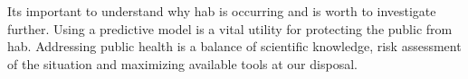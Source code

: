 Its important to understand why \gls{hab} is occurring and is worth to investigate further. Using a predictive model is a vital utility for protecting the public from \gls{hab}. Addressing public health is a balance of scientific knowledge, risk assessment of the situation and maximizing available tools at our disposal. 






